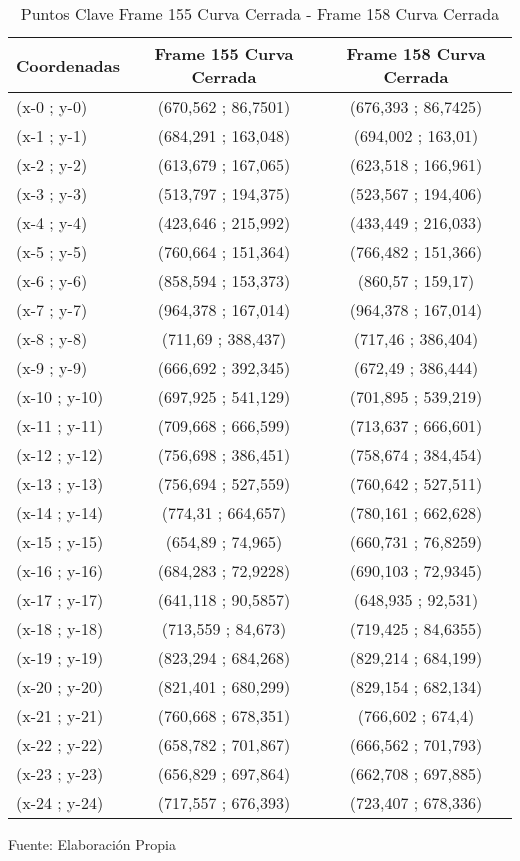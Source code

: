 \begin{table}[htbp]
	\centering
	\begin{tabular}{|l|c|c|}
		\hline
		Coordenadas & Frame 155 Curva Cerrada & Frame 158 Curva Cerrada	\\ \hline 
		(x-0 ; y-0) & (670,562 ; 86,7501) & (676,393 ; 86,7425) \\
		(x-1 ; y-1) & (684,291 ; 163,048) & (694,002 ; 163,01) \\
		(x-2 ; y-2) & (613,679 ; 167,065) & (623,518 ; 166,961) \\
		(x-3 ; y-3) & (513,797 ; 194,375) & (523,567 ; 194,406) \\
		(x-4 ; y-4) & (423,646 ; 215,992) & (433,449 ; 216,033) \\
		(x-5 ; y-5) & (760,664 ; 151,364) & (766,482 ; 151,366) \\
		(x-6 ; y-6) & (858,594 ; 153,373) & (860,57 ; 159,17) \\
		(x-7 ; y-7) & (964,378 ; 167,014) & (964,378 ; 167,014) \\
		(x-8 ; y-8) & (711,69 ; 388,437) & (717,46 ; 386,404) \\
		(x-9 ; y-9) & (666,692 ; 392,345) & (672,49 ; 386,444) \\
		(x-10 ; y-10) & (697,925 ; 541,129) & (701,895 ; 539,219) \\
		(x-11 ; y-11) & (709,668 ; 666,599) & (713,637 ; 666,601) \\
		(x-12 ; y-12) & (756,698 ; 386,451) & (758,674 ; 384,454) \\
		(x-13 ; y-13) & (756,694 ; 527,559) & (760,642 ; 527,511) \\
		(x-14 ; y-14) & (774,31 ; 664,657) & (780,161 ; 662,628) \\
		(x-15 ; y-15) & (654,89 ; 74,965) & (660,731 ; 76,8259) \\
		(x-16 ; y-16) & (684,283 ; 72,9228) & (690,103 ; 72,9345) \\
		(x-17 ; y-17) & (641,118 ; 90,5857) & (648,935 ; 92,531) \\
		(x-18 ; y-18) & (713,559 ; 84,673) & (719,425 ; 84,6355) \\
		(x-19 ; y-19) & (823,294 ; 684,268) & (829,214 ; 684,199) \\
		(x-20 ; y-20) & (821,401 ; 680,299) & (829,154 ; 682,134) \\
		(x-21 ; y-21) & (760,668 ; 678,351) & (766,602 ; 674,4) \\
		(x-22 ; y-22) & (658,782 ; 701,867) & (666,562 ; 701,793) \\
		(x-23 ; y-23) & (656,829 ; 697,864) & (662,708 ; 697,885) \\
		(x-24 ; y-24) & (717,557 ; 676,393) & (723,407 ; 678,336) \\ \hline 
	\end{tabular}%
	\caption{Puntos Clave Frame 155 Curva Cerrada - Frame 158 Curva Cerrada}
	\footnotesize Fuente: Elaboración Propia
	\label{checkeroriginalpart3}
\end{table}%


